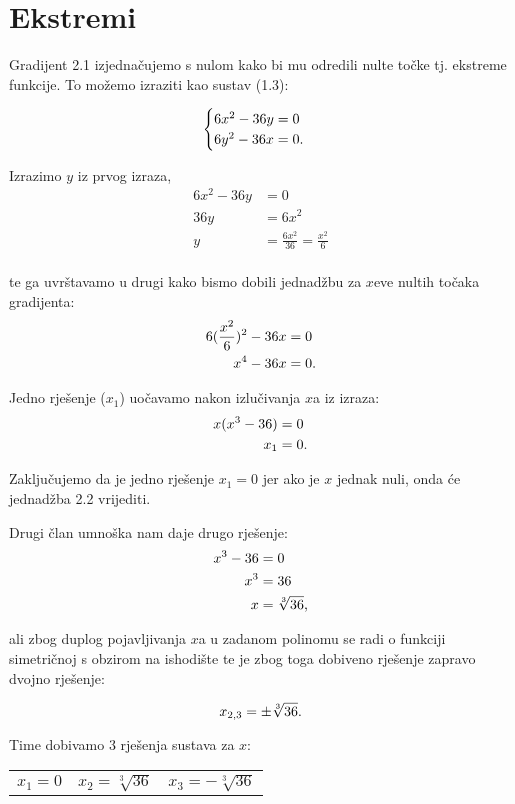 \section{Ekstremi}

Gradijent 2.1 izjednačujemo s nulom kako bi mu odredili nulte točke tj. ekstreme funkcije.
To možemo izraziti kao sustav (1.3):

$$
\begin{cases}
    6x^2 - 36y = 0 \\
    6y^2 - 36x = 0 \textnormal{.}
\end{cases}
$$

Izrazimo $y$ iz prvog izraza,
\begin{align*}
    6x^2 - 36y &= 0 \\
    36y & = 6x^2 \\
    y & = \frac{6x^2}{36} = \frac{x^2}{6} \\
\end{align*}

te ga uvrštavamo u drugi kako bismo dobili jednadžbu za $x$eve nultih točaka gradijenta:
\begin{align}
    6(\frac{x^2}{6})^2 - 36x & = 0 \nonumber \\
    x^4 - 36x & = 0 \textnormal{.}
\end{align}

Jedno rješenje ($x_1$) uočavamo nakon izlučivanja $x$a iz izraza:
\begin{align*}
    x(x^3 - 36) &= 0 \\
    x_1 &= 0 \textnormal{.}
\end{align*}

Zaključujemo da je jedno rješenje $x_1 = 0$ jer ako je $x$ jednak nuli, onda će jednadžba 2.2 vrijediti. \par

Drugi član umnoška nam daje drugo rješenje:
\begin{align*}
    x^3 - 36 &= 0 \\
    x^3 &= 36 \\
    x &= \sqrt[3]{36} \textnormal{,}
\end{align*}

ali zbog duplog pojavljivanja $x$a u zadanom polinomu se radi o funkciji simetričnoj s obzirom na ishodište te je zbog toga dobiveno rješenje zapravo dvojno rješenje:

$$
x_{2,3} = \pm \sqrt[3]{36} \textnormal{.}
$$

Time dobivamo 3 rješenja sustava za $x$:
\begin{center}
\begin{tabular}{c c c}
    $x_1 = 0$ & $x_2 = \sqrt[3]{36}$ & $x_3 = -\sqrt[3]{36}$\\
\end{tabular}
\end{center}

